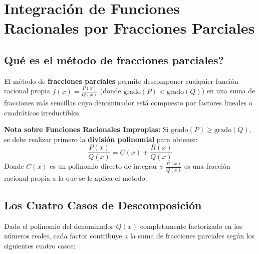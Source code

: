 \documentclass[12pt, letterpaper]{article}
\begin{document}
\vspace{10pt}
\newpage 

\section{Integración de Funciones Racionales por Fracciones Parciales}

\subsection{\textquestiondown Qué es el método de fracciones parciales?}
El método de \textbf{fracciones parciales} permite descomponer cualquier función racional propia $f(x) = \frac{P(x)}{Q(x)}$ (donde $\text{grado}(P) < \text{grado}(Q)$) en una suma de fracciones más sencillas cuyo denominador está compuesto por factores lineales o cuadráticos irreductibles.

\begin{cuadroextra}
\noindent\textbf{Nota sobre Funciones Racionales Impropias:}
Si $\text{grado}(P) \ge \text{grado}(Q)$, se debe realizar primero la \textbf{división polinomial} para obtener:
$$\frac{P(x)}{Q(x)} = C(x) + \frac{R(x)}{Q(x)}$$
Donde $C(x)$ es un polinomio directo de integrar y $\frac{R(x)}{Q(x)}$ es una fracción racional propia a la que se le aplica el método.
\end{cuadroextra}

\subsection{Los Cuatro Casos de Descomposición}
Dado el polinomio del denominador $Q(x)$ completamente factorizado en los números reales, cada factor contribuye a la suma de fracciones parciales según los siguientes cuatro casos:
\end{document}
